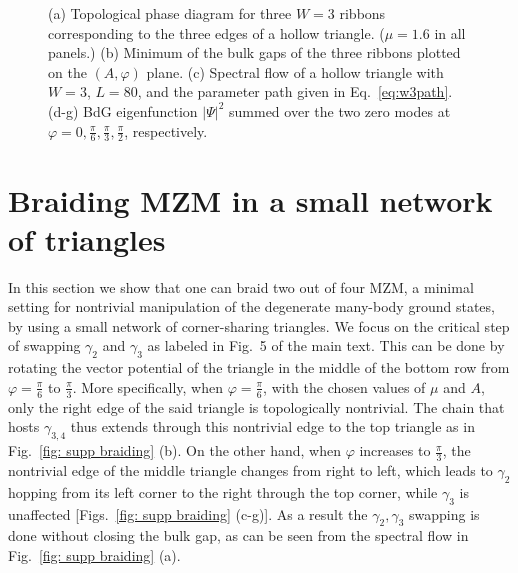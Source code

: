 \documentclass[aps,prb,showpacs,amsmath,amssymb,superscriptaddress]{revtex4-2}
\begin{document}
\begin{figure}[ht]
  \hspace{-31.5pt}
  \caption{(a) Topological phase diagram for three $W=3$ ribbons corresponding to the three edges of a hollow triangle. ($\mu=1.6$ in all panels.) (b) Minimum of the bulk gaps of the three ribbons plotted on the $(A,\varphi)$ plane. (c) Spectral flow of a hollow triangle with $W=3$, $L=80$, and the parameter path given in Eq.~\eqref{eq:w3path}. (d-g) BdG eigenfunction $|\Psi|^2$ summed over the two zero modes at $\varphi = 0, \frac{\pi}{6}, \frac{\pi}{3}, \frac{\pi}{2}$, respectively.}
  \label{fig: supp rotation}
\end{figure}

\section{Braiding MZM in a small network of triangles}

In this section we show that one can braid two out of four MZM, a minimal setting for nontrivial manipulation of the degenerate many-body ground states, by using a small network of corner-sharing triangles. We focus on the critical step of swapping $\gamma_2$ and $\gamma_3$ as labeled in Fig.~5 of the main text. This can be done by rotating the vector potential of the triangle in the middle of the bottom row from $\varphi = \frac{\pi}{6}$ to $\frac{\pi}{3}$. More specifically, when $\varphi = \frac{\pi}{6}$, with the chosen values of $\mu$ and $A$, only the right edge of the said triangle is topologically nontrivial. The chain that hosts $\gamma_{3,4}$ thus extends through this nontrivial edge to the top triangle as in Fig.~\ref{fig: supp braiding} (b). On the other hand, when $\varphi$ increases to $\frac{\pi}{3}$, the nontrivial edge of the middle triangle changes from right to left, which leads to $\gamma_2$ hopping from its left corner to the right through the top corner, while $\gamma_3$ is unaffected [Figs.~\ref{fig: supp braiding} (c-g)]. As a result the $\gamma_2,\gamma_3$ swapping is done without closing the bulk gap, as can be seen from the spectral flow in Fig.~\ref{fig: supp braiding} (a).
\end{document}
